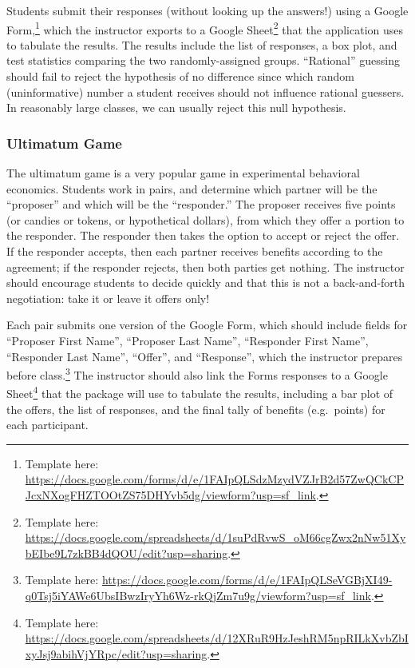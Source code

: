 \documentclass[
]{article}
\begin{document}
Students submit their responses (without looking up the answers!) using
a Google Form,\footnote{Template here:
  \url{https://docs.google.com/forms/d/e/1FAIpQLSdzMzydVZJrB2d57ZwQCkCPJcxNXogFHZTOOtZS75DHYvb5dg/viewform?usp=sf_link}.}
which the instructor exports to a Google Sheet\footnote{Template here:
  \url{https://docs.google.com/spreadsheets/d/1suPdRvwS_oM66cgZwx2nNw51XybEIbe9L7zkBB4dQOU/edit?usp=sharing}.}
that the application uses to tabulate the results. The results include
the list of responses, a box plot, and test statistics comparing the two
randomly-assigned groups. ``Rational'' guessing should fail to reject
the hypothesis of no difference since which random (uninformative)
number a student receives should not influence rational guessers. In
reasonably large classes, we can usually reject this null hypothesis.

\hypertarget{ultimatum-game}{%
\subsubsection{Ultimatum Game}\label{ultimatum-game}}

The ultimatum game is a very popular game in experimental behavioral
economics. Students work in pairs, and determine which partner will be
the ``proposer'' and which will be the ``responder.'' The proposer
receives five points (or candies or tokens, or hypothetical dollars),
from which they offer a portion to the responder. The responder then
takes the option to accept or reject the offer. If the responder
accepts, then each partner receives benefits according to the agreement;
if the responder rejects, then both parties get nothing. The instructor
should encourage students to decide quickly and that this is not a
back-and-forth negotiation: take it or leave it offers only!

Each pair submits one version of the Google Form, which should include
fields for ``Proposer First Name'', ``Proposer Last Name'', ``Responder
First Name'', ``Responder Last Name'', ``Offer'', and ``Response'',
which the instructor prepares before class.\footnote{Template here:
  \url{https://docs.google.com/forms/d/e/1FAIpQLSeVGBjXI49-q0Tsj5iYAWe6UbsIBwzIryYh6Wz-rkQjZm7u9g/viewform?usp=sf_link}.}
The instructor should also link the Forms responses to a Google
Sheet\footnote{Template here:
  \url{https://docs.google.com/spreadsheets/d/12XRuR9HzJeshRM5npRILkXvbZbIxyJsj9abihVjYRpc/edit?usp=sharing}.}
that the package will use to tabulate the results, including a bar plot
of the offers, the list of responses, and the final tally of benefits
(e.g.~points) for each participant.
\end{document}
